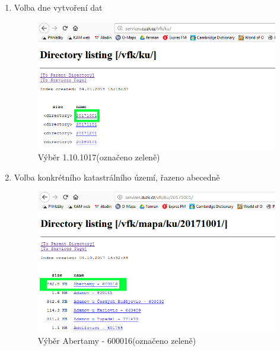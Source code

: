 \begin{enumerate}
  \item{Volba dne vytvoření dat}
  \begin{figure}[H]
	 \centering
      \includegraphics[width=15cm]{./pictures/stazeni_dat_3kr.png}
      \caption{Výběr 1.10.1017(označeno zeleně)}
      \label{fig:3kr_stazeni}
  \end{figure}
  
  \item{Volba konkrétního katastrálního území, řazeno abecedně}
  \begin{figure}[H]
	 \centering
      \includegraphics[width=15cm]{./pictures/stazeni_dat_4kr.png}
      \caption{Výběr Abertamy - 600016(označeno zeleně)}
      \label{fig:4kr_stazeni}
  \end{figure}
  

\end{enumerate}
